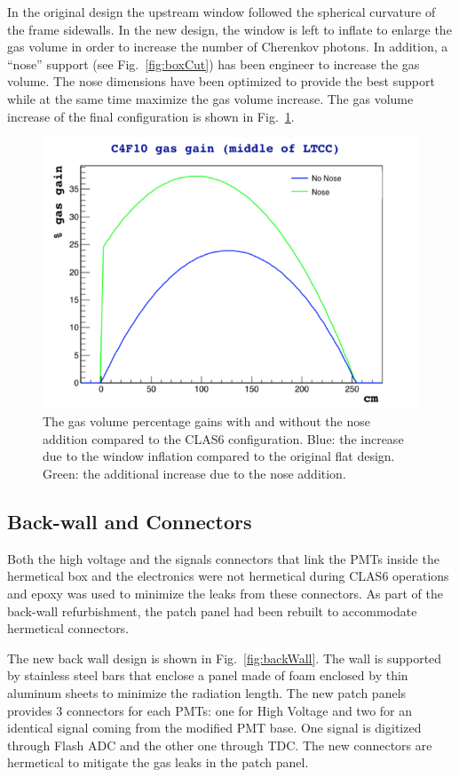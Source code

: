 In the original design the upstream window followed the spherical curvature of the frame sidewalls. In the new design, the window is left to inflate
to enlarge the gas volume in order to increase the number of Cherenkov photons. In addition, a ``nose'' support (see Fig.~\ref{fig:boxCut})
has been engineer to increase the gas volume.
The nose dimensions have been optimized to provide the best support while at the same time maximize the gas volume increase. The gas volume increase
of the final configuration is shown in Fig.~\ref{fig:noseVolume}.

\begin{figure}[h]
	\centering
	\includegraphics[width=0.95\columnwidth,keepaspectratio]{img/noseVolume.png}
	\caption{The gas volume percentage gains with and without the nose addition compared to the CLAS6 configuration. Blue: the increase due
	          to the window inflation compared to the original flat design. Green: the additional increase due to the nose addition. }
	\label{fig:noseVolume}
\end{figure}


\subsection{Back-wall and Connectors}

Both the high voltage and the signals connectors that link the PMTs inside the hermetical box and the electronics were not
hermetical during CLAS6 operations and epoxy was used to minimize the leaks from these connectors.
As part of the back-wall refurbishment, the patch panel had been rebuilt to accommodate hermetical connectors.

The new back wall design is shown in Fig.~\ref{fig:backWall}. The wall is supported by stainless steel bars that enclose a panel made of foam enclosed by
thin aluminum sheets to minimize the radiation length.
The new patch panels provides 3 connectors for each PMTs: one for High Voltage and two for an identical signal coming from the modified PMT base.
One signal is digitized through Flash ADC and the other one through TDC. The new connectors are hermetical to mitigate the gas leaks in the patch panel.


